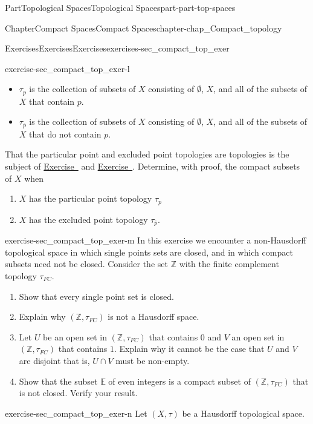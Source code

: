 \documentclass[oneside,10pt,]{book}
\newcommand{\xreffont}{\relax}
\numberwithin{equation}{chapter}
\newcommand{\Z}{\mathbb{Z}}
\newcommand{\E}{\mathbb{E}}
\begin{document}
\begin{partptx}{Part}{Topological Spaces}{}{Topological Spaces}{}{}{part-part-top-spaces}
\begin{chapterptx}{Chapter}{Compact Spaces}{}{Compact Spaces}{}{}{chapter-chap_Compact_topology}
\begin{exercises-section}{Exercises}{Exercises}{}{Exercises}{}{}{exercises-sec_compact_top_exer}
\begin{divisionexercise}{11}{}{}{exercise-sec_compact_top_exer-l}
\begin{itemize}[label=\textbullet]
\item{}\(\tau_{p}\) is the collection of subsets of \(X\) consisting of \(\emptyset\), \(X\), and all of the subsets of \(X\) that contain \(p\).%
\item{}\(\tau_{\overline{p}}\) is the collection of subsets of \(X\) consisting of \(\emptyset\), \(X\), and all of the subsets of \(X\) that do not contain \(p\).%
\end{itemize}
That the particular point and excluded point topologies are topologies is the subject of \hyperlink{exercise-ex_particular_point_topology}{Exercise~{\xreffont 9}} and \hyperlink{exercise-ex_excluded_point_topology}{Exercise~{\xreffont 10}}. Determine, with proof, the compact subsets of \(X\) when%
\begin{enumerate}[font=\bfseries,label=(\alph*),ref=\alph*]%
\item{}\(X\) has the particular point topology \(\tau_p\)%
\item{}\(X\) has the excluded point topology \(\tau_{\overline{p}}\).%
\end{enumerate}%
\end{divisionexercise}%
\begin{divisionexercise}{12}{}{}{exercise-sec_compact_top_exer-m}%
In this exercise we encounter a non-Hausdorff topological space in which single points sets are closed, and in which compact subsets need not be closed. Consider the set \(\Z\) with the finite complement topology \(\tau_{FC}\).%
\begin{enumerate}[font=\bfseries,label=(\alph*),ref=\alph*]%
\item{}Show that every single point set is closed.%
\item{}Explain why \((\Z, \tau_{FC})\) is not a Hausdorff space.%
\item{}Let \(U\) be an open set in \((\Z, \tau_{FC})\) that contains \(0\) and \(V\) an open set in \((\Z, \tau_{FC})\) that contains \(1\). Explain why it cannot be the case that \(U\) and \(V\) are disjoint \textemdash{} that is, \(U \cap V\) must be non-empty.%
\item{}Show that the subset \(\E\) of even integers is a compact subset of \((\Z, \tau_{FC})\) that is not closed. Verify your result.%
\end{enumerate}%
\end{divisionexercise}%
\begin{divisionexercise}{13}{}{}{exercise-sec_compact_top_exer-n}%
Let \((X, \tau)\) be a Hausdorff topological space.%
\begin{enumerate}[font=\bfseries,label=(\alph*),ref=\alph*]%

\end{enumerate}
\end{divisionexercise}
\end{exercises-section}
\end{chapterptx}
\end{partptx}
\end{document}
